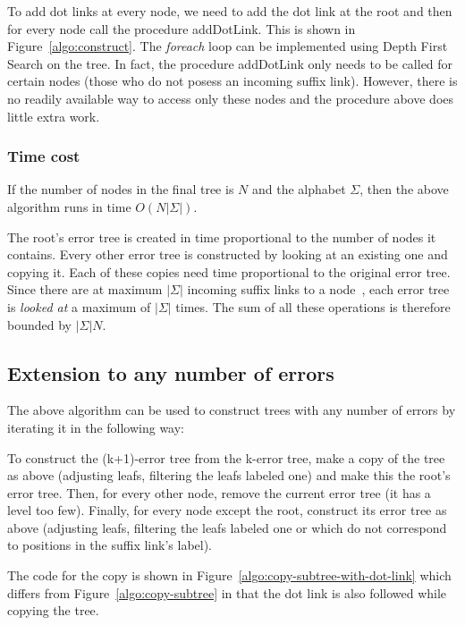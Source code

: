 \documentclass[letter,10pt]{article}
\begin{document}


To add dot links at every node, we need to add the dot link at the root and then for every node call the procedure addDotLink. This is shown in Figure~\ref{algo:construct}. The \textit{foreach} loop can be implemented using Depth First Search on the tree. In fact, the procedure addDotLink only needs to be called for certain nodes (those who do not posess an incoming suffix link). However, there is no readily available way to access only these nodes and the procedure above does little extra work.

\subsubsection{Time cost}

If the number of nodes in the final tree is $N$ and the alphabet $\Sigma$, then the above algorithm runs in time $O(N|\Sigma|)$.

The root's error tree is created in time proportional to the number of nodes it contains. Every other error tree is constructed by looking at an existing one and copying it. Each of these copies need time proportional to the original error tree. Since there are at maximum $|\Sigma|$ incoming suffix links to a node~\cite{}, each error tree is \emph{looked at} a maximum of $|\Sigma|$ times. The sum of all these operations is therefore bounded by $|\Sigma|N$.

\subsection{Extension to any number of errors}

The above algorithm can be used to construct trees with any number of errors by iterating it in the following way:

To construct the (k+1)-error tree from the k-error tree, make a copy of the tree as above (adjusting leafs, filtering the leafs labeled one) and make this the root's error tree. Then, for every other node, remove the current error tree (it has a level too few). Finally, for every node except the root, construct its error tree as above (adjusting leafs, filtering the leafs labeled one or which do not correspond to positions in the suffix link's label).



The code for the copy is shown in Figure~\ref{algo:copy-subtree-with-dot-link} which differs from Figure~\ref{algo:copy-subtree} in that the dot link is also followed while copying the tree.
\end{document}
